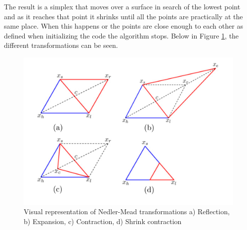 The result is a simplex that moves over a surface in search of the lowest point and as it reaches that point it shrinks until all the points are practically at the same place. When this happens or the points are close enough to each other as defined when initializing the code the algorithm stops. Below in Figure \ref{neldermeadfig}, the different transformations can be seen.

\begin{figure}\label{neldermeadfig}
\centering
\includegraphics[width=\linewidth]{figures/MAP_expl.png}
\caption{Visual representation of Nedler-Mead transformations a) Reflection, b) Expansion, c) Contraction, d) Shrink contraction \citep{sachin:2016}}
\end{figure}


